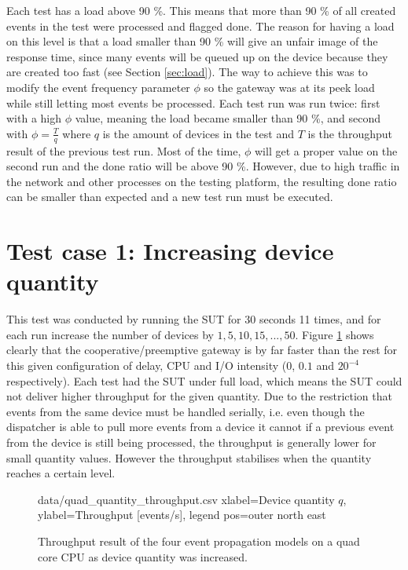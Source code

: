 Each test has a load above 90 \%. This means that more than 90 \% of all
created events in the test were processed and flagged done. The reason for
having a load on this level is that a load smaller than 90 \% will give an
unfair image of the response time, since many events will be queued up on the
device because they are created too fast (see Section \ref{sec:load}). The way
to achieve this was to modify the event frequency parameter $\phi$ so the
gateway was at its peek load while still letting most events be processed. Each
test run was run twice: first with a high $\phi$ value, meaning the load became
smaller than 90 \%, and second with $\phi = \frac{T}{q}$ where $q$ is the
amount of devices in the test and $T$ is the throughput result of the previous
test run. Most of the time, $\phi$ will get a proper value on the second run
and the done ratio will be above 90 \%. However, due to high traffic in the
network and other processes on the testing platform, the resulting done ratio
can be smaller than expected and a new test run must be executed.

\section{Test case 1: Increasing device quantity}

This test was conducted by running the SUT for 30 seconds 11 times, and for
each run increase the number of devices by $1, 5, 10, 15, ..., 50$. Figure
\ref{fig:quad_quantity_throughput} shows clearly that the
cooperative/preemptive gateway is by far faster than the rest for this given
configuration of delay, CPU and I/O intensity (0, $0.1$ and $20^{-4}$
respectively). Each test had the SUT under full load, which means the SUT could
not deliver higher throughput for the given quantity. Due to the restriction
that events from the same device must be handled serially, i.e. even though the
dispatcher is able to pull more events from a device it cannot if a previous
event from the device is still being processed, the throughput is generally
lower for small quantity values. However the throughput stabilises when the
quantity reaches a certain level.

\begin{figure}[h!]
    \centering
    \performanceplot
    {data/quad_quantity_throughput.csv}
    {
        xlabel=Device quantity $q$,
        ylabel={Throughput [events/s]},
        legend pos=outer north east
    }

    \caption[Throughput result when device quantity was increased.]{Throughput result of the four event propagation models on a quad
    core CPU as device quantity was increased.}

    \label{fig:quad_quantity_throughput}
\end{figure}

